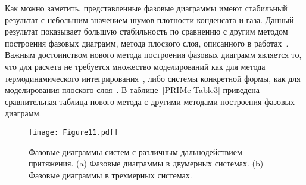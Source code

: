 Как можно заметить, представленные фазовые диаграммы имеют стабильный результат с небольшим значением шумов плотности конденсата и газа.
Данный результат показывает большую стабильность по сравнению с другим методом построения фазовых диаграмм,  метода плоского слоя, описанного в работах~\cite{10.1021/jp806127j, 10.1021/jp1117213}.
Важным достоинством нового метода построения фазовых диаграмм является то, что для расчета не требуется множество моделирований как для метода термодинамического интегрирования~\cite{10.1080/00268976.2019.1699185}, либо системы конкретной формы, как для моделирования плоского слоя~\cite{10.1021/jp806127j, 10.1021/jp1117213}.
В таблице~\ref{PRIMe-Table3} приведена сравнительная таблица нового метода с другими методами построения фазовых диаграмм.



\begin{table}[h!]
    \caption{Сравнение различных методов построения фазовых диаграмм. Под 2D и 3D понимается применимость данных методов в двумерных или трехмерных системах; под скоростью подразумевается величина затраченого времени в человеко-часах на одну точку фазовой диаграммы относительно других представленных методов; под точностью понимается точность метода относительно других представленных методов.}
    \label{PRIMe-Table3}
\end{table}



\begin{figure*}[!t]
    \centering
    \texttt{[image: Figure11.pdf]}
    \caption{Фазовые диаграммы систем с различным дальнодействием притяжения.
    (a) Фазовые диаграммы в двумерных системах.
    (b) Фазовые диаграммы в трехмерных системах.}
    \label{phase_diagram}
\end{figure*}


